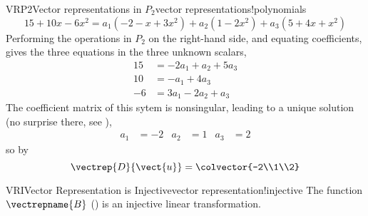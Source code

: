 \begin{example}{VRP2}{Vector representations in $P_2$}{vector representations!polynomials}
%
\begin{equation*}
15+10x-6x^2=a_1(-2-x+3x^2)+a_2(1-2x^2)+a_3(5+4x+x^2)
\end{equation*}
%
Performing the operations in $P_2$ on the right-hand side, and equating coefficients, gives the three equations in the three unknown scalars,
%
\begin{align*}
15&=-2a_1+a_2+5a_3\\
10&=-a_1+4a_3\\
-6&=3a_1-2a_2+a_3
\end{align*}
%
The coefficient matrix of this sytem is nonsingular, leading to a unique solution (no surprise there, see ),
%
\begin{align*}
a_1&=-2&a_2&=1&a_3&=2
\end{align*}
%
so by 
%
\begin{equation*}
\vectrep{D}{\vect{u}}=\colvector{-2\\1\\2}
\end{equation*}
%
\end{example}
%
\begin{theorem}{VRI}{Vector Representation is Injective}{vector representation!injective}
The function $\vectrepname{B}$ () is an injective linear transformation.
\end{theorem}
%
